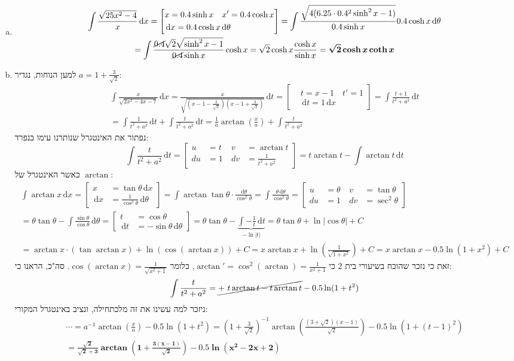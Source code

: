 \documentclass[]{article}
\newcommand\tant  {\tan \theta}
\newcommand\sinhx {\sinh x}
\newcommand\coshx {\cosh x}
\newcommand\dx    {\,\mathrm{d}x}
\newcommand\dt    {\,\mathrm{d}t}
\newcommand\dtt   {\,\mathrm{d}\theta}
\newcommand\pt[3]{\csb{\begin{aligned}
			&t = #1 \quad t' = #2 \\
			&\dt = #2 \dx #3
\end{aligned}}}
\newcommand\pts[2]{\csb{\begin{aligned}
t &= #1 \quad \\
\dt &= #2
\end{aligned}}}
\newcommand\px[3]{\csb{\begin{aligned}
&x = #1 \quad x' = #2 \\
&\dx = #2 #3
\end{aligned}}}
\newcommand\pxs[2]{\csb{\begin{aligned}
x &= #1\\
\dx &= #2
\end{aligned}}}
\newcommand\udv[4]{\csb{\begin{aligned}
			u &= #1  \ & v &= #3 \\
			du &= #2 \ & dv &= #4
\end{aligned}}}
\newcommand\ta    {\theta}
\newcommand\op    {^{-1}}
\newcommand\cl [1]    {\left ( #1 \right )}
\newcommand\csb[1]    {\left [ #1 \right ]}
\begin{document}
	\section{}
	\begin{enumerate}[a.]
		\item 
		\begin{multline*}
			\int \frac{\sqrt{25x^2 - 4}}{x}\dx = \px{0.4\sinhx}{0.4\coshx}{\dtt} = \int \frac{\sqrt{4(6.25 \cdot 0.4^2\sinh^2x - 1)}}{0.4\sinhx} 0.4\coshx\dtt \\
			= \int \frac{\cancel{0.4}\sqrt2\sqrt{\sinh^2x - 1}}{\cancel{0.4}\sinhx}\coshx = \sqrt{2}\coshx \frac{\coshx}{\sinhx} = \bm{\sqrt2 \coshx \coth x}
		\end{multline*}
		\item למען הנוחות, נגדיר $a = 1 + \frac{3}{\sqrt2}$: 
		\begin{multline*}
			\int \frac{x}{\sqrt{2x^2 - 4x - 7}} \dx = \frac{x}{\sqrt{\cl{x - 1 - \frac{3}{\sqrt2}}\cl{x - 1 + \frac{3}{\sqrt2}}}} \dt = \pt{x - 1}{1}{} = \int \frac{t + 1}{t^2 + a^2}\dt \\
			= \int \frac{1}{t^2 + a^2} \dt + \int \frac{t}{t^2 + a^2} \dt = \frac{1}{a}\arctan\cl{\frac{x}{a}} + \int \frac{t}{t^2 + a^2}
		\end{multline*}
		נפתור את האינטגרל שנותרנו עימו בנפרד: 
		\[ \int \frac{t}{t^2 + a^2} \dt = \udv{t}{1}{\arctan t}{\tfrac{1}{t^2 + a^2}} = t \arctan t - \int \arctan t \dt \]
		כאשר האינטגרל של $\arctan$: 
		\begin{multline*}
			\int \arctan x \dx = \pxs{\tant\dx}{\tfrac{1}{\cos^2\ta}\dtt} = \int \arctan \tant \cdot \frac{\dtt}{\cos^2 \ta} = \int \frac{\ta \dtt}{\cos^2\ta} = \udv{\ta}{1}{\tan\ta}{\sec^2\ta} \\
			= \ta \tan \ta - \int \frac{\sin\ta}{\cos\ta}\dtt = \pts{\cos \ta}{-\sin \ta \dtt} = \ta \tan \ta  - \underbrace{\int -\frac{1}{t} \dt}_{-\ln |t|} = \ta \tan \ta + \ln |\cos \ta| + C \\
			= \arctan x \cdot (\tan \arctan x) + \ln (\cos(\arctan x)) + C = x \arctan x + \ln \cl{\tfrac{1}{\sqrt{1 + x^2}}} + C = x\arctan x - 0.5 \ln (1 + x^2) + C
		\end{multline*}
		זאת כי נזכר שהוכח בשיעורי בית 2 כי $\arctan' = \cos^2(\arctan) = \frac{1}{x^2 + 1}$, כלומר $\cos(\arctan x) = \frac{1}{\sqrt{x^2 + 1}}$. סה"כ, הראנו כי: 
		\[ \int \frac{t}{t^2 + a^2} = \cancel{+\ t \arctan t - t \arctan t} - 0.5\ln(1 + t^2) \]
		ניזכר למה עשינו את זה מלכתחילה, ונציב באינטגרל המקורי: 
		\begin{multline*}
			\cdots = a\op \arctan\cl{\frac{x}{a}} - 0.5\ln(1 + t^2) = \cl{1 + \frac{3}{\sqrt2}}\op \arctan \cl{\frac{(3 + \sqrt2)(x - 1)}{\sqrt2}} - 0.5 \ln (1 + (t - 1)^2) \\
			= \bm{\frac{\sqrt 2}{\sqrt 2 + 3} \arctan \cl{1 + \frac{3(x - 1)}{\sqrt2}} - 0.5\ln(x^2 - 2x + 2)}
		\end{multline*}
		
		\end{enumerate}
\end{document}
